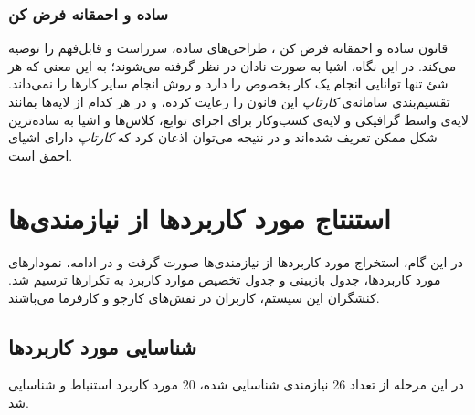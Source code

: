 \documentclass[12pt,svgnames,oneside]{book}
\begin{document}
\subsection{ساده و احمقانه فرض کن}
قانون ساده و احمقانه فرض کن
، طراحی‌های ساده، سرراست و قابل‌فهم را توصیه می‌کند. در این نگاه، اشیا به صورت نادان در نظر گرفته می‌شوند؛ به این معنی که هر شئ تنها توانایی انجام یک کار بخصوص را دارد و روش انجام سایر کار‌ها را نمی‌داند. تقسیم‌بندی سامانه‌ی \textit{کارتاپ} این قانون را رعایت کرده، و در هر کدام از لایه‌ها بمانند لایه‌ی واسط گرافیکی و لایه‌ی کسب‌وکار برای اجرای توابع، کلاس‌ها و اشیا به ساده‌ترین شکل ممکن تعریف شده‌اند و در نتیجه می‌توان اذعان کرد که \textit{کارتاپ} دارای اشیای احمق است.



\chapter{استنتاج مورد کاربرد‌ها از نیازمندی‌‌ها}		
در این گام، استخراج مورد کاربرد‌ها از نیازمندی‌ها صورت گرفت و در ادامه، نمودار‌‌های مورد کاربرد‌ها، جدول بازبینی و جدول تخصیص موارد کاربرد به تکرار‌‌ها ترسیم شد. کنشگران این سیستم، کاربران در نقش‌های کارجو و کارفرما می‌باشند.

\section{شناسایی مورد کاربرد‌ها}		
در این مرحله از تعداد 26 نیازمندی شناسایی شده، 20 مورد کاربرد استنباط و شناسایی شد.
\end{document}
